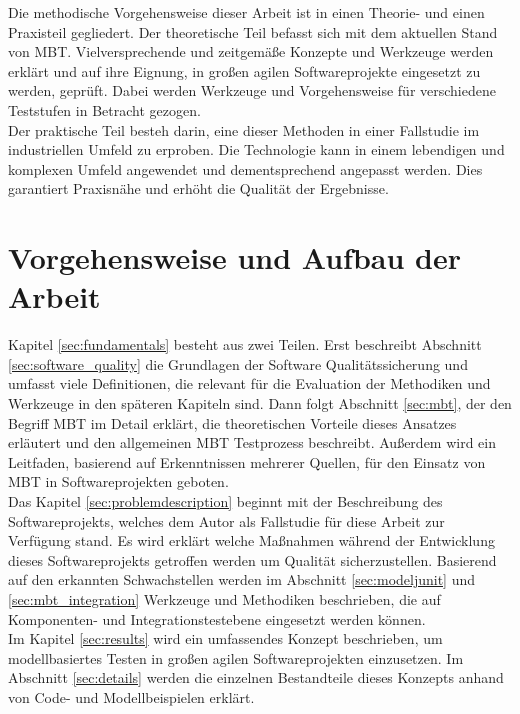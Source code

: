 Die methodische Vorgehensweise dieser Arbeit ist in einen Theorie- und einen Praxisteil gegliedert. Der theoretische Teil befasst sich mit dem aktuellen Stand von \Gls{MBT}. Vielversprechende und zeitgemäße Konzepte und Werkzeuge werden erklärt und auf ihre Eignung, in großen agilen Softwareprojekte eingesetzt zu werden, geprüft. Dabei werden Werkzeuge und Vorgehensweise für verschiedene Teststufen in Betracht gezogen.\\
Der praktische Teil besteh darin, eine dieser Methoden in einer Fallstudie im industriellen Umfeld zu erproben. Die Technologie kann in einem lebendigen und komplexen Umfeld angewendet und dementsprechend angepasst werden. Dies garantiert Praxisnähe und erhöht die Qualität der Ergebnisse.

\section{Vorgehensweise und Aufbau der Arbeit}
Kapitel \ref{sec:fundamentals}  besteht aus zwei Teilen. Erst beschreibt Abschnitt \ref{sec:software_quality} die Grundlagen der Software Qualitätssicherung und umfasst viele Definitionen, die relevant für die Evaluation der Methodiken und Werkzeuge in den späteren Kapiteln sind. Dann folgt Abschnitt \ref{sec:mbt}, der den Begriff \Gls{MBT} im Detail erklärt, die theoretischen Vorteile dieses Ansatzes erläutert und den allgemeinen \Gls{MBT} Testprozess beschreibt. Außerdem wird ein Leitfaden, basierend auf Erkenntnissen mehrerer Quellen, für den Einsatz von \Gls{MBT} in Softwareprojekten geboten.\\

Das Kapitel \ref{sec:problemdescription}  beginnt mit der Beschreibung des Softwareprojekts, welches dem Autor als Fallstudie für diese Arbeit zur Verfügung stand. Es wird erklärt welche Maßnahmen während der Entwicklung dieses Softwareprojekts getroffen werden um Qualität sicherzustellen. Basierend auf den erkannten Schwachstellen werden im Abschnitt \ref{sec:modeljunit} und \ref{sec:mbt_integration} Werkzeuge und Methodiken beschrieben, die auf Komponenten- und Integrationstestebene eingesetzt werden können.\\

Im Kapitel \ref{sec:results} wird ein umfassendes Konzept beschrieben, um modellbasiertes Testen in großen agilen Softwareprojekten einzusetzen. Im Abschnitt \ref{sec:details} werden die einzelnen Bestandteile dieses Konzepts anhand von Code- und Modellbeispielen erklärt.\\


